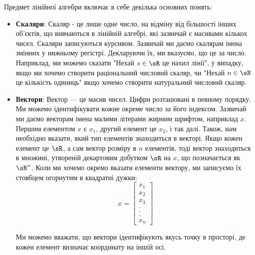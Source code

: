 Предмет лінійної алгебри включає в себе декілька основних понять:
\begin{itemize}
\item \textbf{Скаляри}: Скаляр - це лише одне число, на відміну від більшості інших
об'єктів, що вивчаються в лінійній алгебрі, які зазвичай є масивами кількох чисел.
Скаляри записуються курсивом. Зазвичай ми даємо скалярам імена змінних у нижньому регістрі.
Декларуючи їх, ми вказуємо, що це за число. Наприклад, ми можемо сказати "Нехай $s \in \displaystyle \sR$ це нахил лінії", у випадку, якщо ми хочемо створити раціональний числовий скаляр, чи "Нехай $n \in \displaystyle \sN$ це кількість одиниць" якщо хочемо створити натуральний числовий скаляр. 
\item \textbf{Вектори}: Вектор — це масив чисел. Цифри розташовані в
певному порядку. Ми можемо ідентифікувати кожне окреме число за його індексом.
Зазвичай ми даємо векторам імена малими літерами жирним шрифтом, наприклад $x$. Першим елементом $x$ є $x_1$, другий елемент це $x_2$, і так далі. Також, нам необхідно вказати, який тип елементів знаходиться в векторі. Якщо кожен елемент це $\sR$, а сам вектор розміру в $n$ елементів, тоді вектор знаходиться в множині, утвореній декартовим добутком $\sR$ на $x$, що позначається як $\sR^{n}$. Коли ми хочемо окремо вказати елементи вектору, ми записуємо їх стовбцем огорнутим в квадратні дужки:
\begin{equation}
x = \begin{bmatrix}
x_1\\
x_2\\
x_3\\
.\\
.\\
.\\
x_n
\end{bmatrix}
\end{equation}

Ми можемо вважати, що вектори ідентифікують якусь точку в просторі, де кожен елемент визначає координату на іншій осі.


\end{itemize}
